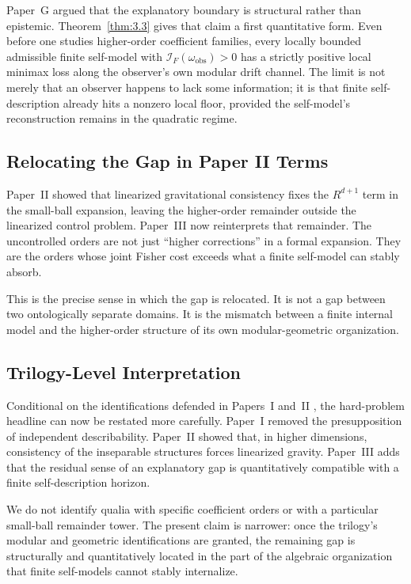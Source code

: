 \documentclass[12pt]{article}
\theoremstyle{definition}
\theoremstyle{remark}
\begin{document}
Paper~G\cite{PaperG} argued that the explanatory boundary is structural
rather than epistemic. Theorem~\ref{thm:3.3} gives that claim a first
quantitative form. Even before one studies higher-order coefficient
families, every locally bounded admissible finite self-model with
\(\mathcal{I}_F(\omega_{\mathrm{obs}})>0\) has a strictly positive local
minimax loss along the observer's own modular drift channel. The limit
is not merely that an observer happens to lack some information; it is
that finite self-description already hits a nonzero local floor,
provided the self-model's reconstruction remains in the quadratic
regime.

\subsection{Relocating the Gap in Paper II Terms}\label{subsec:6.2}

Paper~II\cite{PaperII} showed that linearized gravitational consistency
fixes the \(R^{d+1}\) term in the small-ball expansion, leaving the
higher-order remainder outside the linearized control problem. Paper~III
now reinterprets that remainder. The uncontrolled orders are not just
``higher corrections'' in a formal expansion. They are the orders whose
joint Fisher cost exceeds what a finite self-model can stably absorb.

This is the precise sense in which the gap is relocated. It is not a
gap between two ontologically separate domains. It is the mismatch
between a finite internal model and the higher-order structure of its
own modular-geometric organization.

\subsection{Trilogy-Level Interpretation}\label{subsec:6.3}

Conditional on the identifications defended in Papers~I and~II
\cite{PaperI,PaperII}, the hard-problem headline can now be restated
more carefully. Paper~I removed the presupposition of independent
describability. Paper~II showed that, in higher dimensions, consistency
of the inseparable structures forces linearized gravity. Paper~III adds
that the residual sense of an explanatory gap is quantitatively
compatible with a finite self-description horizon.

We do not identify qualia with specific coefficient orders or with a
particular small-ball remainder tower. The present claim is narrower:
once the trilogy's modular and geometric identifications are granted,
the remaining gap is structurally and quantitatively located in the part
of the algebraic organization that finite self-models cannot stably
internalize.
\end{document}
